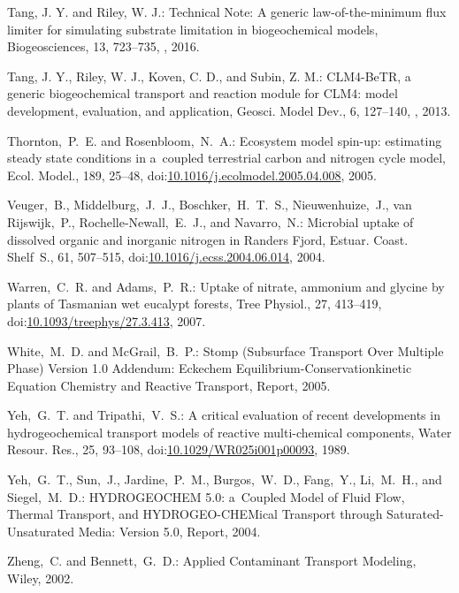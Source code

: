 \documentclass[gmd,noline]{copernicus}
\begin{document}
\begin{thebibliography}{55}
Tang, J. Y. and Riley, W. J.: Technical Note: A generic law-of-the-minimum
flux limiter for simulating substrate limitation in biogeochemical models,
Biogeosciences, 13, 723--735, ,
2016.


\hack{\newpage}
Tang, J. Y., Riley, W. J., Koven, C. D., and Subin, Z. M.: CLM4-BeTR, a
generic biogeochemical transport and reaction module for CLM4: model
development, evaluation, and application, Geosci. Model Dev., 6, 127--140,
, 2013.



Thornton,~P.~E. and Rosenbloom,~N.~A.:
Ecosystem model spin-up: estimating steady state conditions in a~coupled terrestrial carbon and nitrogen cycle model,
Ecol. Model.,
189, 25--48,
doi:\href{http://dx.doi.org/10.1016/j.ecolmodel.2005.04.008}{10.1016/j.ecolmodel.2005.04.008}, 2005.


Veuger,~B., Middelburg,~J.~J., Boschker,~H.~T.~S., Nieuwenhuize,~J., van Rijswijk,~P., Rochelle-Newall,~E.~J., and Navarro,~N.:
Microbial uptake of dissolved organic and inorganic nitrogen in Randers Fjord,
Estuar. Coast. Shelf~S.,
61, 507--515,
doi:\href{http://dx.doi.org/10.1016/j.ecss.2004.06.014}{10.1016/j.ecss.2004.06.014}, 2004.


Warren,~C.~R. and Adams,~P.~R.:
Uptake of nitrate, ammonium and glycine by plants of Tasmanian wet eucalypt forests,
Tree Physiol.,
27, 413--419,
doi:\href{http://dx.doi.org/10.1093/treephys/27.3.413}{10.1093/treephys/27.3.413}, 2007.


White,~M.~D. and McGrail,~B.~P.:
Stomp (Subsurface Transport Over Multiple Phase) Version 1.0 Addendum: Eckechem Equilibrium-Conservationkinetic Equation Chemistry and Reactive Transport, Report,
  2005.

Yeh,~G.~T. and Tripathi,~V.~S.:
A critical evaluation of recent developments in hydrogeochemical transport models of reactive multi-chemical components,
Water Resour. Res.,
25, 93--108,
doi:\href{http://dx.doi.org/10.1029/WR025i001p00093}{10.1029/WR025i001p00093}, 1989.


Yeh,~G.~T., Sun,~J., Jardine,~P.~M., Burgos,~W.~D., Fang,~Y., Li,~M.~H., and Siegel,~M.~D.:
HYDROGEOCHEM 5.0: a~Coupled Model of Fluid Flow, Thermal Transport, and HYDROGEO-CHEMical Transport through Saturated-Unsaturated Media: Version 5.0, Report,
  2004.

Zheng,~C. and Bennett,~G.~D.: Applied Contaminant Transport Modeling, Wiley,
2002.

\end{thebibliography}
\end{document}
